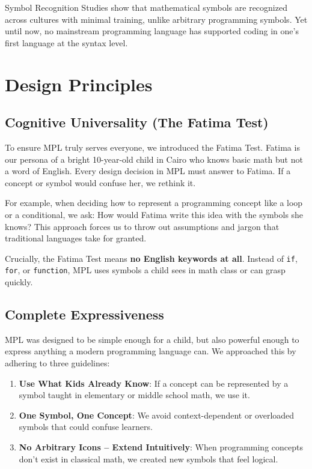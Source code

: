 \documentclass[10pt,conference]{IEEEtran}
\begin{document}
Symbol Recognition Studies \cite{blackwell2006} show that mathematical symbols are recognized across cultures with minimal training, unlike arbitrary programming symbols. Yet until now, no mainstream programming language has supported coding in one's first language at the syntax level.

\section{Design Principles}

\subsection{Cognitive Universality (The Fatima Test)}

To ensure MPL truly serves everyone, we introduced the Fatima Test. Fatima is our persona of a bright 10-year-old child in Cairo who knows basic math but not a word of English. Every design decision in MPL must answer to Fatima. If a concept or symbol would confuse her, we rethink it.

For example, when deciding how to represent a programming concept like a loop or a conditional, we ask: How would Fatima write this idea with the symbols she knows? This approach forces us to throw out assumptions and jargon that traditional languages take for granted.

Crucially, the Fatima Test means \textbf{no English keywords at all}. Instead of \texttt{if}, \texttt{for}, or \texttt{function}, MPL uses symbols a child sees in math class or can grasp quickly.

\subsection{Complete Expressiveness}

MPL was designed to be simple enough for a child, but also powerful enough to express anything a modern programming language can. We approached this by adhering to three guidelines:

\begin{enumerate}
\item \textbf{Use What Kids Already Know}: If a concept can be represented by a symbol taught in elementary or middle school math, we use it.
\item \textbf{One Symbol, One Concept}: We avoid context-dependent or overloaded symbols that could confuse learners.
\item \textbf{No Arbitrary Icons – Extend Intuitively}: When programming concepts don't exist in classical math, we created new symbols that feel logical.
\end{enumerate}
\end{document}
